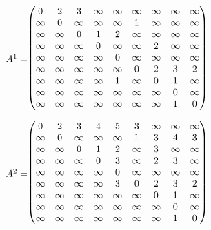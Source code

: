 \documentclass[12pt,a4paper]{article} %
\begin{document}
{\begin{figure}[ht]
\begin{tikzpicture}[scale=1.0, every node/.style={transform shape}]
 
\end{tikzpicture}
\end{figure}

\begin{figure}[H]
\centering
\begin{minipage}{0.46\textwidth}
\centering
\footnotesize
$\vcenter{\hbox{$A^1 = $}}\hspace{-0.07cm} \begin{pmatrix}
0 & 2 & 3 & \infty & \infty & \infty & \infty & \infty & \infty \\
\infty & 0 & \infty & \infty & \infty & 1 & \infty & \infty & \infty \\
\infty & \infty & 0 & 1 & 2 & \infty & \infty & \infty & \infty \\
\infty & \infty & \infty & 0 & \infty & \infty & 2 & \infty & \infty \\
\infty & \infty & \infty & \infty & 0 & \infty & \infty & \infty & \infty \\
\infty & \infty & \infty & \infty & \infty & 0 & 2 & 3 & 2 \\
\infty & \infty & \infty & \infty & 1 & \infty & 0 & 1 & \infty \\
\infty & \infty & \infty & \infty & \infty & \infty & \infty & 0 & \infty \\
\infty & \infty & \infty & \infty & \infty & \infty & \infty & 1 & 0
\end{pmatrix}$
\end{minipage}
\hspace{1cm}
\begin{minipage}{0.46\textwidth}
\centering
\footnotesize
$\vcenter{\hbox{$A^2 = $}}\hspace{-0.07cm} \begin{pmatrix}
0 & 2 & 3 & 4 & 5 & 3 & \infty & \infty & \infty \\
\infty & 0 & \infty & \infty & \infty & 1 & 3 & 4 & 3 \\
\infty & \infty & 0 & 1 & 2 & \infty & 3 & \infty  & \infty \\
\infty & \infty & \infty & 0 & 3 & \infty & 2 & 3 & \infty \\
\infty & \infty & \infty & \infty & 0 & \infty & \infty & \infty & \infty \\
\infty & \infty & \infty & \infty & 3 & 0 & 2 & 3 & 2 \\
\infty & \infty & \infty & \infty & \infty & \infty & 0 & 1 & \infty \\
\infty & \infty & \infty & \infty & \infty & \infty & \infty & 0 & \infty \\
\infty & \infty & \infty & \infty & \infty & \infty & \infty & 1 & 0
\end{pmatrix}$
\end{minipage}
\end{figure}

}
\end{document}
